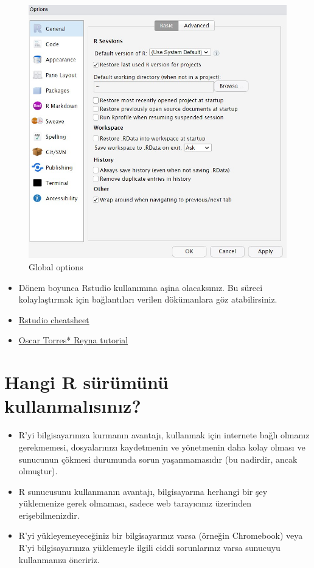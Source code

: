 \documentclass[
  oneside]{book}
\begin{document}
\begin{figure}

{\centering \includegraphics[width=1\linewidth]{images/global_options} 

}

\caption{Global options}\label{fig:img-options}
\end{figure}

\begin{itemize}
\item
  Dönem boyunca Rstudio kullanımına aşina olacaksınız. Bu süreci kolaylaştırmak için bağlantıları verilen dökümanlara göz atabilirsiniz.
\item
  \href{Kaynaklar/rstudio-ide.pdf}{Rstudio cheatsheet}
\item
  \href{Kaynaklar/rstudio_tutorial.pdf}{Oscar Torres* Reyna tutorial}
\end{itemize}

\hypertarget{hangi-r-suxfcruxfcmuxfcnuxfc-kullanmalux131sux131nux131z}{%
\section{Hangi R sürümünü kullanmalısınız?}\label{hangi-r-suxfcruxfcmuxfcnuxfc-kullanmalux131sux131nux131z}}

\begin{itemize}
\item
  R'yi bilgisayarınıza kurmanın avantajı, kullanmak için internete bağlı olmanız gerekmemesi, dosyalarınızı kaydetmenin ve yönetmenin daha kolay olması ve sunucunun çökmesi durumunda sorun yaşanmamasıdır (bu nadirdir, ancak olmuştur).
\item
  R sunucusunu kullanmanın avantajı, bilgisayarına herhangi bir şey yüklemenize gerek olmaması, sadece web tarayıcınız üzerinden erişebilmenizdir.
\item
  R'yi yükleyemeyeceğiniz bir bilgisayarınız varsa (örneğin Chromebook) veya R'yi bilgisayarınıza yüklemeyle ilgili ciddi sorunlarınız varsa sunucuyu kullanmanızı öneririz.
\end{itemize}
\end{document}

